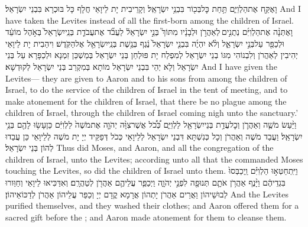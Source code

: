 {וָאֶקַּ֖ח אֶת\maqqaf הַלְוִיִּ֑ם תַּ֥חַת כׇּל\maqqaf בְּכ֖וֹר בִּבְנֵ֥י יִשְׂרָאֵֽל׃}
{וְקָרֵיבִית יָת לֵיוָאֵי חֲלָף כָּל בּוּכְרָא בִּבְנֵי יִשְׂרָאֵל׃}
{And I have taken the Levites instead of all the first-born among the children of Israel.}{}
{וָאֶתְּנָ֨ה אֶת\maqqaf הַלְוִיִּ֜ם נְתֻנִ֣ים \legarmeh  לְאַהֲרֹ֣ן וּלְבָנָ֗יו מִתּוֹךְ֮ בְּנֵ֣י יִשְׂרָאֵל֒ לַעֲבֹ֞ד אֶת\maqqaf עֲבֹדַ֤ת בְּנֵֽי\maqqaf יִשְׂרָאֵל֙ בְּאֹ֣הֶל מוֹעֵ֔ד וּלְכַפֵּ֖ר עַל\maqqaf בְּנֵ֣י יִשְׂרָאֵ֑ל וְלֹ֨א יִהְיֶ֜ה בִּבְנֵ֤י יִשְׂרָאֵל֙ נֶ֔גֶף בְּגֶ֥שֶׁת בְּנֵֽי\maqqaf יִשְׂרָאֵ֖ל אֶל\maqqaf הַקֹּֽדֶשׁ׃}
{וִיהַבִית יָת לֵיוָאֵי יְהִיבִין לְאַהֲרֹן וְלִבְנוֹהִי מִגּוֹ בְנֵי יִשְׂרָאֵל לְמִפְלַח יָת פּוּלְחַן בְּנֵי יִשְׂרָאֵל בְּמַשְׁכַּן זִמְנָא וּלְכַפָּרָא עַל בְּנֵי יִשְׂרָאֵל וְלָא יְהֵי בִּבְנֵי יִשְׂרָאֵל מוֹתָא בְּמִקְרַב בְּנֵי יִשְׂרָאֵל לְקוּדְשָׁא׃}
{And I have given the Levites— they are given to Aaron and to his sons from among the children of Israel, to do the service of the children of Israel in the tent of meeting, and to make atonement for the children of Israel, that there be no plague among the children of Israel, through the children of Israel coming nigh unto the sanctuary.’}{}
{וַיַּ֨עַשׂ מֹשֶׁ֧ה וְאַהֲרֹ֛ן וְכׇל\maqqaf עֲדַ֥ת בְּנֵי\maqqaf יִשְׂרָאֵ֖ל לַלְוִיִּ֑ם כְּ֠כֹ֠ל אֲשֶׁר\maqqaf צִוָּ֨ה יְהֹוָ֤ה אֶת\maqqaf מֹשֶׁה֙ לַלְוִיִּ֔ם כֵּן\maqqaf עָשׂ֥וּ לָהֶ֖ם בְּנֵ֥י יִשְׂרָאֵֽל׃}
{וַעֲבַד מֹשֶׁה וְאַהֲרֹן וְכָל כְּנִשְׁתָּא דִּבְנֵי יִשְׂרָאֵל לְלֵיוָאֵי כְּכֹל דְּפַקֵּיד יְיָ יָת מֹשֶׁה לְלֵיוָאֵי כֵּן עֲבַדוּ לְהוֹן בְּנֵי יִשְׂרָאֵל׃}
{Thus did Moses, and Aaron, and all the congregation of the children of Israel, unto the Levites; according unto all that the \lord\space commanded Moses touching the Levites, so did the children of Israel unto them.}{}
{וַיִּֽתְחַטְּא֣וּ הַלְוִיִּ֗ם וַֽיְכַבְּסוּ֙ בִּגְדֵיהֶ֔ם וַיָּ֨נֶף אַהֲרֹ֥ן אֹתָ֛ם תְּנוּפָ֖ה לִפְנֵ֣י יְהֹוָ֑ה וַיְכַפֵּ֧ר עֲלֵיהֶ֛ם אַהֲרֹ֖ן לְטַהֲרָֽם׃}
{וְאִדַּכִּיאוּ לֵיוָאֵי וְחַוַּורוּ לְבוּשֵׁיהוֹן וַאֲרֵים אַהֲרֹן יָתְהוֹן אֲרָמָא קֳדָם יְיָ וְכַפַּר עֲלֵיהוֹן אַהֲרֹן לְדַכּוֹאֵיהוֹן׃}
{And the Levites purified themselves, and they washed their clothes; and Aaron offered them for a sacred gift before the \lord; and Aaron made atonement for them to cleanse them.}{}

